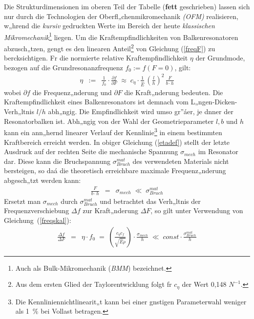 Die Strukturdimensionen im oberen Teil der Tabelle ({\bf fett}
geschrieben) lassen
sich nur durch die Technologien der Oberfl„chenmikromechanik
{\em (OFM)} realisieren, w„hrend die {\em kursiv}
gedruckten Werte im Bereich der heute {\em klassischen
Mikromechanik}\footnote{Auch als Bulk-Mikromechanik ({\em BMM}) bezeichnet.}
liegen. Um die Kraftempfindlichkeiten
von Balkenresonatoren abzusch„tzen, gengt es den linearen
Anteil\footnote{Aus dem ersten Glied der Taylorentwicklung folgt fr
$c_{\eta}$ der Wert 0,148 $N^{-1}$.} von Gleichung (\ref{freqF})
zu bercksichtigen. Fr die normierte relative Kraftempfindlichkeit
$\eta$ der Grundmode, bezogen auf die Grundresonanzfrequenz
$f_{0} := f(F=0)$, gilt:
%
\begin{eqnarray}
\label{etadef}
     \eta & := & \frac{1}{f_{0}} \cdot \frac{\partial f}{\partial F}
          \; \approx \; c_{\eta} \cdot \frac{1}{\hat E} \,
            \left( \frac{l}{h} \right)^{2} \, \frac{F}{b \cdot h}
\end{eqnarray}
%
wobei $\partial f$ die Frequenz„nderung und $\partial F$ die Kraft„nderung
bedeuten.
Die Kraftempfindlichkeit eines Balkenresonators ist demnach vom
L„ngen-Dicken-Verh„ltnis $ l/h $ abh„ngig.  Die Empfindlichkeit wird
umso gr”áer, je dnner der Resonatorbalken ist.  Abh„ngig von der Wahl
der Geometrieparameter $l, b$ und $h$ kann ein ann„hernd linearer
Verlauf der Kennlinie\footnote{Die Kennliniennichtlinearit„t kann bei
einer gnstigen Parameterwahl weniger als 1~\% bei Vollast betragen.} in
einem bestimmten Kraftbereich erreicht werden.  In obiger Gleichung
(\ref{etadef})
stellt der letzte Ausdruck auf der rechten Seite die mechanische
Spannung $\sigma_{mech}$ im Resonator dar.  Diese kann die
Bruchspannung $\sigma_{Bruch}^{mat}$ des verwendeten Materials nicht
bersteigen, so daá die theoretisch erreichbare maximale
Frequenz„nderung abgesch„tzt werden kann:
%
\begin{eqnarray}
     \frac{F}{b \cdot h} & = & \sigma_{mech}
     \; \ll \; \sigma_{Bruch}^{mat}
\end{eqnarray}
%
Ersetzt man $\sigma_{mech}$ durch $\sigma_{Bruch}^{mat}$ und betrachtet
das Verh„ltnis der Frequenzverschiebung $\Delta f$ zur Kraft„nderung
$\Delta F$, so gilt unter Verwendung von Gleichung~(\ref{freqskal}):
%
\begin{eqnarray}
\label{etaf}
    \frac{\Delta f}{\Delta F} & = & \eta \cdot f_{0} \; = \;
     \left( \frac{c_{\eta}c_{f}}{\sqrt{\hat E \rho}} \right) \cdot
     \frac{\sigma_{mech}}{h} \; \ll \; const \cdot
     \frac{\sigma_{Bruch}^{mat}}{h}
\end{eqnarray}
